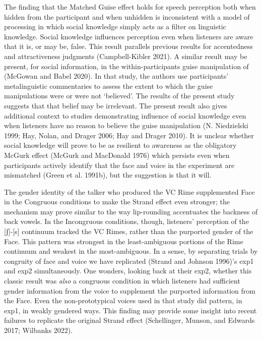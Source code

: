\documentclass[
  letterpaper,
  DIV=11,
  numbers=noendperiod]{scrartcl}
\begin{document}
The finding that the Matched Guise effect holds for speech perception
both when hidden from the participant and when unhidden is inconsistent
with a model of processing in which social knowledge simply acts as a
filter on linguistic knowledge. Social knowledge influences perception
even when listeners are aware that it is, or may be, false. This result
parallels previous results for accentedness and attractiveness judgments
(Campbell-Kibler 2021). A similar result may be present, for social
information, in the within-participants guise manipulation of (McGowan
and Babel 2020). In that study, the authors use participants'
metalinguistic commentaries to assess the extent to which the guise
manipulations were or were not `believed'. The results of the present
study suggests that that belief may be irrelevant. The present result
also gives additional context to studies demonstrating influence of
social knowledge even when listeners have no reason to believe the guise
manipulation (N. Niedzielski 1999; Hay, Nolan, and Drager 2006; Hay and
Drager 2010). It is unclear whether social knowledge will prove to be as
resilient to awareness as the obligatory McGurk effect (McGurk and
MacDonald 1976) which persists even when participants actively identify
that the face and voice in the experiment are mismatched (Green et al.
1991b), but the suggestion is that it will.

The gender identity of the talker who produced the VC Rime supplemented
Face in the Congruous conditions to make the Strand effect even
stronger; the mechanism may prove similar to the way lip-rounding
accentuates the backness of back vowels. In the Incongruous conditions,
though, listeners' perception of the {[}ʃ{]}-{[}s{]} continuum tracked
the VC Rimes, rather than the purported gender of the Face. This pattern
was strongest in the least-ambiguous portions of the Rime continuum and
weakest in the most-ambiguous. In a sense, by separating trials by
congruity of face and voice we have replicated (Strand and Johnson
1996)'s exp1 and exp2 simultaneously. One wonders, looking back at their
exp2, whether this classic result was \emph{also} a congruous condition
in which listeners had sufficient gender information from the voice to
supplement the purported information from the Face. Even the
non-prototypical voices used in that study did pattern, in exp1, in
weakly gendered ways. This finding may provide some insight into recent
failures to replicate the original Strand effect (Schellinger, Munson,
and Edwards 2017; Wilbanks 2022).
\end{document}
